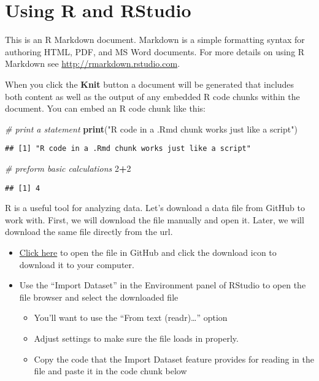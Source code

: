 \documentclass[
]{book}
\newenvironment{Shaded}{\begin{snugshade}}{\end{snugshade}}
\newcommand{\CommentTok}[1]{\textcolor[rgb]{0.56,0.35,0.01}{\textit{#1}}}
\newcommand{\DecValTok}[1]{\textcolor[rgb]{0.00,0.00,0.81}{#1}}
\newcommand{\FunctionTok}[1]{\textcolor[rgb]{0.13,0.29,0.53}{\textbf{#1}}}
\newcommand{\NormalTok}[1]{#1}
\newcommand{\SpecialCharTok}[1]{\textcolor[rgb]{0.81,0.36,0.00}{\textbf{#1}}}
\newcommand{\StringTok}[1]{\textcolor[rgb]{0.31,0.60,0.02}{#1}}
\theoremstyle{definition}
\theoremstyle{definition}
\theoremstyle{definition}
\theoremstyle{definition}
\theoremstyle{remark}
\begin{document}
\hypertarget{using-r-and-rstudio}{%
\section{Using R and RStudio}\label{using-r-and-rstudio}}

This is an R Markdown document. Markdown is a simple formatting syntax for authoring HTML, PDF, and MS Word documents. For more details on using R Markdown see \url{http://rmarkdown.rstudio.com}.

When you click the \textbf{Knit} button a document will be generated that includes both content as well as the output of any embedded R code chunks within the document. You can embed an R code chunk like this:

\begin{Shaded}
\begin{Highlighting}[]
\CommentTok{\# print a statement}
\FunctionTok{print}\NormalTok{(}\StringTok{"R code in a .Rmd chunk works just like a script"}\NormalTok{)}
\end{Highlighting}
\end{Shaded}

\begin{verbatim}
## [1] "R code in a .Rmd chunk works just like a script"
\end{verbatim}

\begin{Shaded}
\begin{Highlighting}[]
\CommentTok{\# preform basic calculations}
\DecValTok{2}\SpecialCharTok{+}\DecValTok{2}
\end{Highlighting}
\end{Shaded}

\begin{verbatim}
## [1] 4
\end{verbatim}

R is a useful tool for analyzing data. Let's download a data file from GitHub to work with. First, we will download the file manually and open it. Later, we will download the same file directly from the url.

\begin{itemize}
\item
  \href{https://github.com/clstacy/GenomicDataAnalysis_Fa23/blob/main/data/ethanol_stress/msn2-4_mutants_EtOH.txt}{Click here} to open the file in GitHub and click the download icon to download it to your computer.
\item
  Use the ``Import Dataset'' in the Environment panel of RStudio to open the file browser and select the downloaded file

  \begin{itemize}
  \item
    You'll want to use the ``From text (readr)\ldots{}'' option
  \item
    Adjust settings to make sure the file loads in properly.
  \item
    Copy the code that the Import Dataset feature provides for reading in the file and paste it in the code chunk below
  \end{itemize}
\end{itemize}
\end{document}
